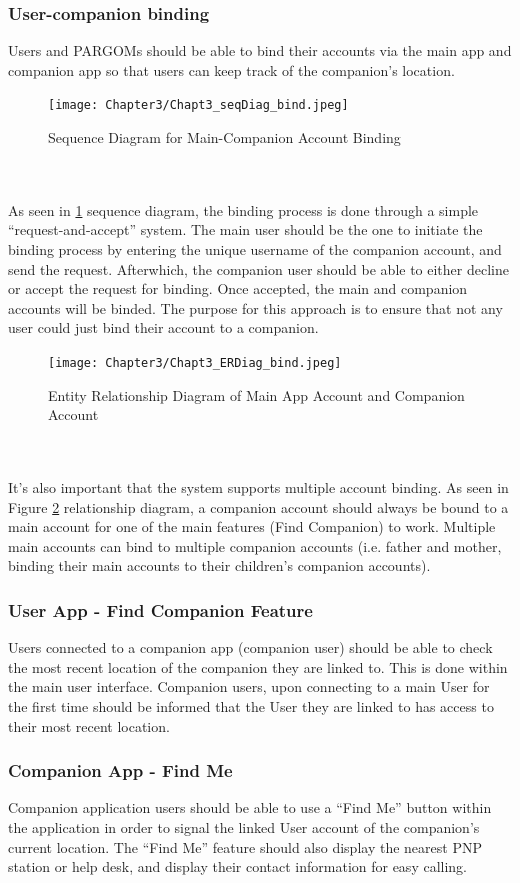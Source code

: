 \subsubsection{User-companion binding}
Users and PARGOMs should be able to bind their accounts via the main app and companion app so that users can keep track of the companion’s location.

\begin{figure}[!h]
    \centering
    \texttt{[image: Chapter3/Chapt3\_seqDiag\_bind.jpeg]}
    \caption{Sequence Diagram for Main-Companion Account Binding}
    \label{fig:seqDiaBind}
\end{figure}
\\\\As seen in \ref{fig:seqDiaBind} sequence diagram, the binding process is done through a simple “request-and-accept” system. The main user should be the one to initiate the binding process by entering the unique username of the companion account, and send the request. Afterwhich, the companion user should be able to either decline or accept the request for binding. Once accepted, the main and companion accounts will be binded. The purpose for this approach is to ensure that not any user could just bind their account to a companion.

\begin{figure}[!h]
    \centering
    \texttt{[image: Chapter3/Chapt3\_ERDiag\_bind.jpeg]}
    \caption{Entity Relationship Diagram of Main App Account and Companion Account}
    \label{fig:ERDBind}
\end{figure}
\\\\It’s also important that the system supports multiple account binding. As seen in Figure \ref{fig:ERDBind} relationship diagram, a companion account should always be bound to a main account for one of the main features (Find Companion) to work. Multiple main accounts can bind to multiple companion accounts (i.e. father and mother, binding their main accounts to their children’s companion accounts).

\subsubsection{User App - Find Companion Feature}
Users connected to a companion app (companion user) should be able to check the most recent location of the companion they are linked to. This is done within the main user interface. Companion users, upon connecting to a main User for the first time should be informed that the User they are linked to has access to their most recent location.

\subsubsection{Companion App - Find Me}
Companion application users should be able to use a “Find Me” button within the application in order to signal the linked User account of the companion’s current location. The “Find Me” feature should also display the nearest PNP station or help desk, and display their contact information for easy calling.